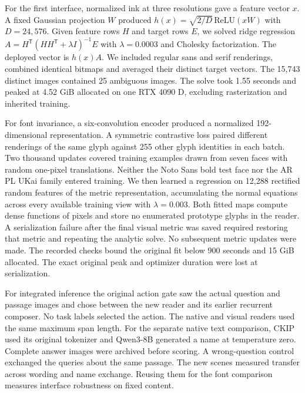 \documentclass[12pt,a4paper]{article}
\providecommand{\DIFadd}[1]{{\protect\color{blue} \sf #1}} %
\begin{document}
\DIFadd{For the first interface, normalized ink at three resolutions gave a feature vector $x$. A fixed Gaussian projection $W$ produced $h(x)=\sqrt{2/D}\,\mathrm{ReLU}(xW)$ with $D=24{,}576$. Given feature rows $H$ and target rows $E$, we solved ridge regression $A=H^{\mathsf T}(HH^{\mathsf T}+\lambda I)^{-1}E$ with $\lambda=0.0003$ and Cholesky factorization. The deployed vector is $h(x)A$. We included regular sans and serif renderings, combined identical bitmaps and averaged their distinct target vectors. The 15,743 distinct images contained 25 ambiguous images. The solve took 1.55 seconds and peaked at 4.52 GiB allocated on one RTX 4090 D, excluding rasterization and inherited training.
}

\DIFadd{For font invariance, a six-convolution encoder produced a normalized 192-dimensional representation. A symmetric contrastive loss paired different renderings of the same glyph against 255 other glyph identities in each batch. Two thousand updates covered training examples drawn from seven faces with random one-pixel translations. Neither the Noto Sans bold test face nor the AR PL UKai family entered training. We then learned a regression on 12,288 rectified random features of the metric representation, accumulating the normal equations across every available training view with $\lambda=0.003$. Both fitted maps compute dense functions of pixels and store no enumerated prototype glyphs in the reader. A serialization failure after the final visual metric was saved required restoring that metric and repeating the analytic solve. No subsequent metric updates were made. The recorded checks bound the original fit below 900 seconds and 15 GiB allocated. The exact original peak and optimizer duration were lost at serialization.
}

\DIFadd{For integrated inference the original action gate saw the actual question and passage images and chose between the new reader and its earlier recurrent composer. No task labels selected the action. The native and visual readers used the same maximum span length. For the separate native text comparison, CKIP used its original tokenizer and Qwen3-8B generated a name at temperature zero. Complete answer images were archived before scoring. A wrong-question control exchanged the queries about the same passage. The new scenes measured transfer across wording and name exchange. Reusing them for the font comparison measures interface robustness on fixed content.
}
\end{document}
